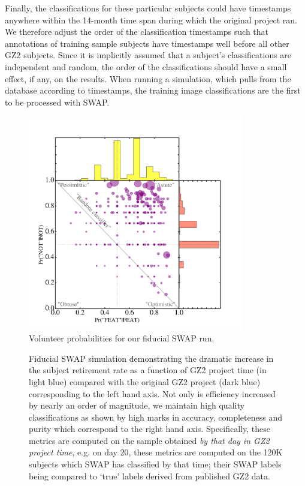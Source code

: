 \documentclass[twocolumn]{aastex6}
\begin{document}
Finally, the classifications for these particular subjects could 
have timestamps anywhere within the 14-month time span during which the original project ran.
We therefore adjust the order of the classification timestamps such that 
annotations of training sample subjects
have timestamps well before all other GZ2 subjects. Since it is implicitly assumed
that a subject's classifications are independent and random, the order of the 
classifications should have a small effect, if any, on the results.  
When running a simulation, which pulls from the database according to timestamps,
the training image classifications are the first to be processed with SWAP.  


\begin{figure}[t!]
\includegraphics[width=3.7in]{figures/test_user_probs.png}
\caption{Volunteer probabilities for our fiducial SWAP run.  \label{fig: volunteer training}}
\end{figure}

\begin{figure}[ht!]
\caption{Fiducial SWAP simulation demonstrating the dramatic increase in the subject retirement rate as a function of GZ2 project time (in light blue) compared with the original GZ2 project (dark blue) corresponding to the left hand axis. Not only is efficiency increased by nearly an order of magnitude, we maintain high quality classifications as shown by high marks in accuracy, completeness and purity which correspond to the right hand axis.  Specifically, these metrics are computed on the sample obtained \textit{by that day in GZ2 project time}, e.g. on day 20, these metrics are computed on the 120K subjects which SWAP has classified by that time; their SWAP labels being compared to `true' labels derived from published GZ2 data. \label{fig: fiducial run}}
\end{figure}
\end{document}
